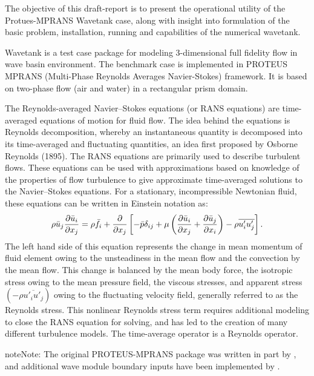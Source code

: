 \documentclass[letterpaper,12pt,english]{sphinxmanual}
\begin{document}
The objective of this draft-report is to present the operational utility of the Protues-MPRANS Wavetank case, along with insight into formulation of the basic problem, installation, running and capabilities of the numerical wavetank.

Wavetank is a test case package for modeling 3-dimensional full fidelity flow in wave basin environment. The benchmark case is implemented in PROTEUS MPRANS (Multi-Phase Reynolds Averages Navier-Stokes) framework. It is based on two-phase flow (air and water) in a rectangular prism domain.

The Reynolds-averaged Navier–Stokes equations (or RANS equations) are time-averaged equations of motion for fluid flow. The idea behind the equations is Reynolds decomposition, whereby an instantaneous quantity is decomposed into its time-averaged and fluctuating quantities, an idea first proposed by Osborne Reynolds (1895). The RANS equations are primarily used to describe turbulent flows. These equations can be used with approximations based on knowledge of the properties of flow turbulence to give approximate time-averaged solutions to the Navier–Stokes equations. For a stationary, incompressible Newtonian fluid, these equations can be written in Einstein notation as:
\begin{gather}
\begin{split}\rho \bar{u}_j \frac{\partial \bar{u}_i}{\partial x_j} = \rho \bar{f}_i + \frac{\partial}{\partial x_j} \left[ -\bar{p}\delta_{ij} + \mu \left( \frac{\partial \bar{u}_i}{\partial x_j} + \frac{\partial \bar{u}_j}{\partial x_i}\right) - \rho \overline{u'_i u'_j} \right].\end{split}\notag
\end{gather}
The left hand side of this equation represents the change in mean momentum of fluid element owing to the unsteadiness in the mean flow and the convection by the mean flow. This change is balanced by the mean body force, the isotropic stress owing to the mean pressure field, the viscous stresses, and apparent stress $\left(-\rho \overline{u'_i u'_j} \right)$ owing to the fluctuating velocity field, generally referred to as the Reynolds stress. This nonlinear Reynolds stress term requires additional modeling to close the RANS equation for solving, and has led to the creation of many different turbulence models. The time-average operator  is a Reynolds operator.

\begin{notice}{note}{Note:}
The original PROTEUS-MPRANS package was written in part by ,  and additional wave module boundary inputs have been implemented by .
\end{notice}
\end{document}
